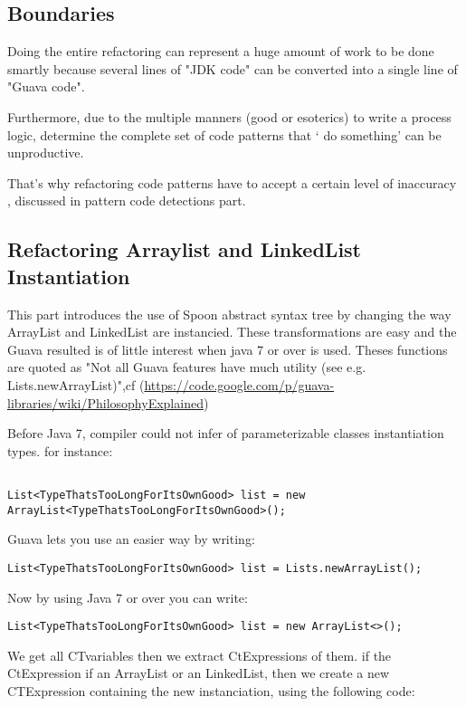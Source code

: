 \documentclass[paper=a4, fontsize=11pt]{scrartcl}
\numberwithin{equation}{section}%
\numberwithin{figure}{section}%
\numberwithin{table}{section}%
\begin{document}
\subsection{Boundaries}
Doing the entire refactoring can represent a huge amount of work to be
done smartly because several lines of "JDK code" can be converted into
a single line of "Guava code".\newline

Furthermore, due to the multiple manners (good or esoterics) to write
a process logic,  determine the complete set of code patterns that `
do something' can be unproductive. \newline

That's why refactoring code patterns have to accept a certain level of inaccuracy , discussed in
pattern code detections part. 

\subsection{Refactoring Arraylist and LinkedList Instantiation}

This part introduces the use of Spoon abstract syntax tree by changing
the way ArrayList and LinkedList are instancied. These transformations
are easy and the Guava resulted is of little interest when java 7 or
over is used. Theses functions are quoted as "Not all Guava features
have much utility (see e.g. Lists.newArrayList)",cf
(\url{https://code.google.com/p/guava-libraries/wiki/PhilosophyExplained})
\newpage

Before Java 7, compiler could not infer of parameterizable classes
instantiation types. for instance:
\begin{verbatim}

List<TypeThatsTooLongForItsOwnGood> list = new
ArrayList<TypeThatsTooLongForItsOwnGood>();
\end{verbatim}

Guava lets you use an easier way by writing:
\begin{verbatim}
List<TypeThatsTooLongForItsOwnGood> list = Lists.newArrayList();
\end{verbatim}

Now by using Java 7 or over you can write:
\begin{verbatim}
List<TypeThatsTooLongForItsOwnGood> list = new ArrayList<>();
\end{verbatim}

We get all CTvariables then we extract CtExpressions of them. if the
CtExpression if an ArrayList or an LinkedList, then we create a new
CTExpression containing the new instanciation, using the following
code:
\end{document}
